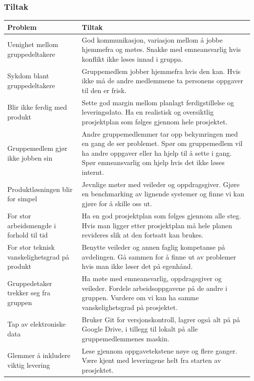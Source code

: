 \documentclass[11pt,a4paper]{report}
\begin{document}
\subsubsection*{Tiltak}
\begin{center}
\begin{longtable}{ |m{6cm}|m{7cm}| } 
 \hline
 \bf Problem \bf & \bf Tiltak \bf \\
 \hline
 Uenighet mellom gruppedeltakere & God kommunikasjon, variasjon mellom å jobbe hjemmefra og møtes. Snakke med emneansvarlig hvis konflikt ikke løses innad i gruppa. \\ 
 \hline
 Sykdom blant gruppedeltakere & Gruppemedlem jobber hjemmefra hvis den kan. Hvis ikke må de andre medlemmene ta personens oppgaver til den er frisk. \\ 
 \hline
 Blir ikke ferdig med produkt & Sette god margin mellom planlagt ferdigstillelse og leveringsdato. Ha en realistisk og oversiktlig prosjektplan som følges gjennom hele prosjektet. \\ 
 \hline
 Gruppemedlem gjør ikke jobben sin & Andre gruppemedlemmer tar opp bekymringen med en gang de ser problemet. Spør om gruppemedlem vil ha andre oppgaver eller ha hjelp til å sette i gang. Spør emneansvarlig om hjelp hvis det ikke løses internt. \\ 
 \hline
 Produktløsningen blir for simpel & Jevnlige møter med veileder og oppdragsgiver. Gjøre en benchmarking av lignende systemer og finne vi kan gjøre for å skille oss ut. \\ 
 \hline
 For stor arbeidsmengde i forhold til tid & Ha en god prosjektplan som følges gjennom alle steg. Hvis man ligger etter prosjektplan må hele planen revideres slik at den fortsatt kan brukes. \\ 
 \hline
 For stor teknisk vanskelighetsgrad på produkt & Benytte veileder og annen faglig kompetanse på avdelingen. Gå sammen for å finne ut av problemer hvis man ikke løser det på egenhånd. \\ 
 \hline
 Gruppedetaker trekker seg fra gruppen & Ha møte med emneansvarlig, oppdragsgiver og veileder. Fordele arbeidsoppgavene på de andre i gruppen. Vurdere om vi kan ha samme vanskelighetsgrad på prosjektet. \\ 
 \hline
 Tap av elektroniske data & Bruker Git for versjonskontroll, lagrer også alt på på Google Drive, i tillegg til lokalt på alle gruppemedlemmenes maskin. \\ 
 \hline
 Glemmer å inkludere viktig levering & Lese gjennom oppgavetekstene nøye og flere ganger. Være kjent med leveringene helt fra starten av prosjektet. \\ 

\end{longtable}
\end{center}
\end{document}
